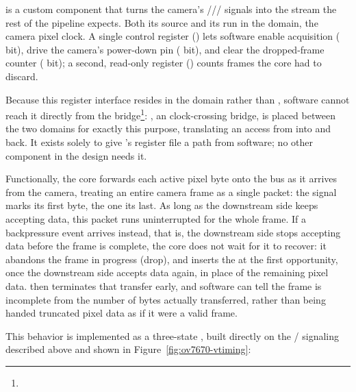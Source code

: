  is a custom  component that turns the camera's /// signals into the  stream the rest of the pipeline expects. Both its  source and its   run in the  domain, the camera pixel clock. A single control register () lets software enable acquisition ( bit), drive the camera's power-down pin ( bit), and clear the dropped-frame counter ( bit); a second, read-only register () counts frames the core had to discard.

Because this register interface resides in the  domain rather than , software cannot reach it directly from the  bridge\footnote{}: , an  clock-crossing bridge, is placed between the two domains for exactly this purpose, translating an  access from  into  and back. It exists solely to give 's register file a path from software; no other component in the design needs it.

Functionally, the core forwards each active pixel byte onto the  bus as it arrives from the camera, treating an entire camera frame as a single  packet: the  signal marks its first byte, the  one its last. As long as the downstream side keeps accepting data, this packet runs uninterrupted for the whole frame. If a backpressure event arrives instead, that is, the downstream side stops accepting data before the frame is complete, the core does not wait for it to recover: it abandons the frame in progress (drop), and inserts the  at the first opportunity, once the downstream side accepts data again, in place of the remaining pixel data.  then terminates that transfer early, and software can tell the frame is incomplete from the number of bytes actually transferred, rather than being handed truncated pixel data as if it were a valid frame.

This behavior is implemented as a three-state , built directly on the / signaling described above and shown in Figure~\ref{fig:ov7670-vtiming}:


